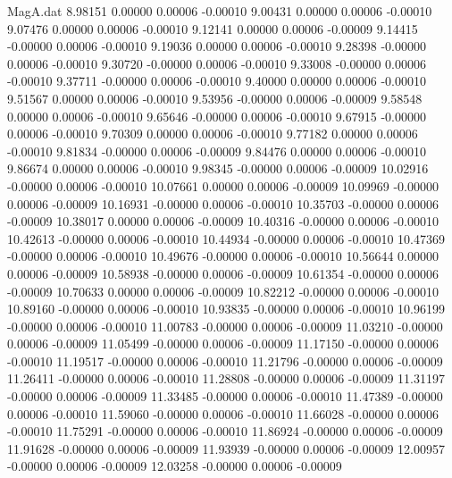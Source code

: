 \begin{filecontents}{MagA.dat}
   8.98151    0.00000    0.00006   -0.00010
   9.00431    0.00000    0.00006   -0.00010
   9.07476    0.00000    0.00006   -0.00010
   9.12141    0.00000    0.00006   -0.00009
   9.14415   -0.00000    0.00006   -0.00010
   9.19036    0.00000    0.00006   -0.00010
   9.28398   -0.00000    0.00006   -0.00010
   9.30720   -0.00000    0.00006   -0.00010
   9.33008   -0.00000    0.00006   -0.00010
   9.37711   -0.00000    0.00006   -0.00010
   9.40000    0.00000    0.00006   -0.00010
   9.51567    0.00000    0.00006   -0.00010
   9.53956   -0.00000    0.00006   -0.00009
   9.58548    0.00000    0.00006   -0.00010
   9.65646   -0.00000    0.00006   -0.00010
   9.67915   -0.00000    0.00006   -0.00010
   9.70309    0.00000    0.00006   -0.00010
   9.77182    0.00000    0.00006   -0.00010
   9.81834   -0.00000    0.00006   -0.00009
   9.84476    0.00000    0.00006   -0.00010
   9.86674    0.00000    0.00006   -0.00010
   9.98345   -0.00000    0.00006   -0.00009
  10.02916   -0.00000    0.00006   -0.00010
  10.07661    0.00000    0.00006   -0.00009
  10.09969   -0.00000    0.00006   -0.00009
  10.16931   -0.00000    0.00006   -0.00010
  10.35703   -0.00000    0.00006   -0.00009
  10.38017    0.00000    0.00006   -0.00009
  10.40316   -0.00000    0.00006   -0.00010
  10.42613   -0.00000    0.00006   -0.00010
  10.44934   -0.00000    0.00006   -0.00010
  10.47369   -0.00000    0.00006   -0.00010
  10.49676   -0.00000    0.00006   -0.00010
  10.56644    0.00000    0.00006   -0.00009
  10.58938   -0.00000    0.00006   -0.00009
  10.61354   -0.00000    0.00006   -0.00009
  10.70633    0.00000    0.00006   -0.00009
  10.82212   -0.00000    0.00006   -0.00010
  10.89160   -0.00000    0.00006   -0.00010
  10.93835   -0.00000    0.00006   -0.00010
  10.96199   -0.00000    0.00006   -0.00010
  11.00783   -0.00000    0.00006   -0.00009
  11.03210   -0.00000    0.00006   -0.00009
  11.05499   -0.00000    0.00006   -0.00009
  11.17150   -0.00000    0.00006   -0.00010
  11.19517   -0.00000    0.00006   -0.00010
  11.21796   -0.00000    0.00006   -0.00009
  11.26411   -0.00000    0.00006   -0.00010
  11.28808   -0.00000    0.00006   -0.00009
  11.31197   -0.00000    0.00006   -0.00009
  11.33485   -0.00000    0.00006   -0.00010
  11.47389   -0.00000    0.00006   -0.00010
  11.59060   -0.00000    0.00006   -0.00010
  11.66028   -0.00000    0.00006   -0.00010
  11.75291   -0.00000    0.00006   -0.00010
  11.86924   -0.00000    0.00006   -0.00009
  11.91628   -0.00000    0.00006   -0.00009
  11.93939   -0.00000    0.00006   -0.00009
  12.00957   -0.00000    0.00006   -0.00009
  12.03258   -0.00000    0.00006   -0.00009

\end{filecontents}

